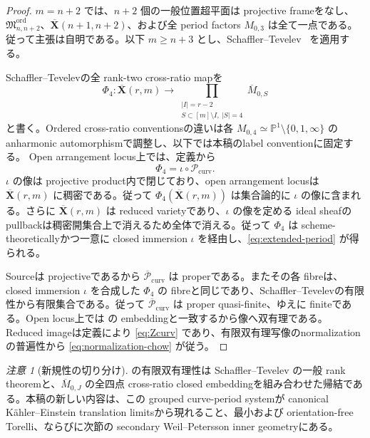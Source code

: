 \documentclass[11pt,a4paper]{ltjsarticle}
\newcommand{\PP}{\mathbb P}
\newcommand{\ov}{\overline}
\newcommand{\cP}{\mathcal P}
\newcommand{\Mord}{\mathfrak M^{\mathrm{ord}}}
\theoremstyle{plain}
\theoremstyle{definition}
\theoremstyle{remark}
\newtheorem{remark}[remark]{注意}
\begin{document}
\begin{proof}
$m=n+2$ では、$n+2$ 個の一般位置超平面は projective frameをなし、$\Mord_{n,n+2}$、$\ov{\mathbf X}(n+1,n+2)$、および全 period factors $M_{0,3}$ は全て一点である。従って主張は自明である。以下 $m\ge n+3$ とし、Schaffler--Tevelev~\cite[Corollary~3.5]{ST} を適用する。

Schaffler--Tevelevの全 rank-two cross-ratio mapを
\[
 \Phi_4:\ov{\mathbf X}(r,m)\longrightarrow
 \prod_{\substack{|I|=r-2\\S\subset[m]\setminus I,\ |S|=4}}
 \ov M_{0,S}
\]
と書く。Ordered cross-ratio conventionsの違いは各 $M_{0,4}\simeq\PP^1\setminus\{0,1,\infty\}$ の anharmonic automorphismで調整し、以下では本稿のlabel conventionに固定する。
Open arrangement locus上では、定義から
\begin{equation}
\label{eq:Phi4factor-open}
 \Phi_4=\iota\circ\cP_{\mathrm{curv}}.
\end{equation}
$\iota$ の像は projective product内で閉じており、open arrangement locusは $\ov{\mathbf X}(r,m)$ に稠密である。従って $\Phi_4(\ov{\mathbf X}(r,m))$ は集合論的に $\iota$ の像に含まれる。さらに $\ov{\mathbf X}(r,m)$ は reduced varietyであり、$\iota$ の像を定める ideal sheafの pullbackは稠密開集合上で消えるため全体で消える。従って $\Phi_4$ は scheme-theoreticallyかつ一意に closed immersion $\iota$ を経由し、\eqref{eq:extended-period} が得られる。

Sourceは projectiveであるから $\ov{\cP}_{\mathrm{curv}}$ は properである。またその各 fibreは、closed immersion $\iota$ を合成した $\Phi_4$ の fibreと同じであり、Schaffler--Tevelevの有限性から有限集合である。従って $\ov{\cP}_{\mathrm{curv}}$ は proper quasi-finite、ゆえに finiteである。Open locus上では  の embeddingと一致するから像へ双有理である。Reduced imageは定義により \eqref{eq:Zcurv} であり、有限双有理写像のnormalizationの普遍性から \eqref{eq:normalization-chow} が従う。
\end{proof}

\begin{remark}[新規性の切り分け]
 の有限双有理性は Schaffler--Tevelev の一般 rank theoremと、$\ov M_{0,J}$ の全四点 cross-ratio closed embeddingを組み合わせた帰結である。本稿の新しい内容は、この grouped curve-period systemが canonical K\"ahler--Einstein translation limitsから現れること、最小および orientation-free Torelli、ならびに次節の secondary Weil--Petersson inner geometryにある。
\end{remark}
\end{document}
